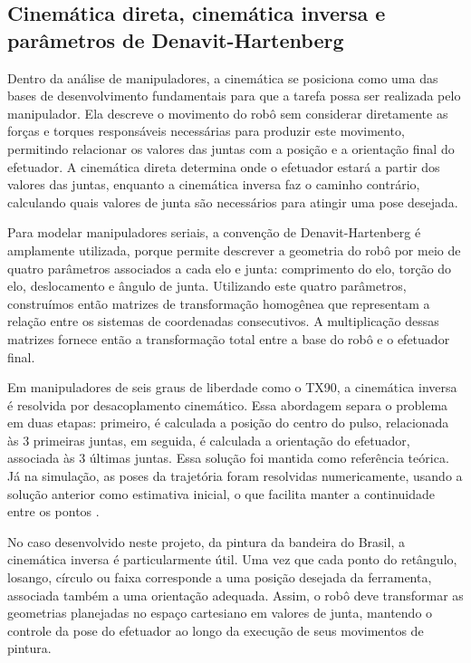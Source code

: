 \subsection{Cinemática direta, cinemática inversa e parâmetros de Denavit-Hartenberg}

Dentro da análise de manipuladores, a cinemática se posiciona como uma das bases de desenvolvimento fundamentais para que a tarefa possa ser realizada pelo manipulador. Ela descreve o movimento do robô sem considerar diretamente as forças e torques responsáveis necessárias para produzir este movimento, permitindo relacionar os valores das juntas com a posição e a orientação final do efetuador. A cinemática direta determina onde o efetuador estará a partir dos valores das juntas, enquanto a cinemática inversa faz o caminho contrário, calculando quais valores de junta são necessários para atingir uma pose desejada. 

Para modelar manipuladores seriais, a convenção de Denavit-Hartenberg é amplamente utilizada, porque permite descrever a geometria do robô por meio de quatro parâmetros associados a cada elo e junta: comprimento do elo, torção do elo, deslocamento e ângulo de junta. Utilizando este quatro parâmetros, construímos então matrizes de transformação homogênea que representam a relação entre os sistemas de coordenadas consecutivos. A multiplicação dessas matrizes fornece então a transformação total entre a base do robô e o efetuador final. 

Em manipuladores de seis graus de liberdade como o TX90, a cinemática inversa é resolvida por desacoplamento cinemático. Essa abordagem separa o problema em duas etapas: primeiro, é calculada a posição do centro do pulso, relacionada às 3 primeiras juntas, em seguida, é calculada a orientação do efetuador, associada às 3 últimas juntas. Essa solução foi mantida como referência teórica. Já na simulação, as poses da trajetória foram resolvidas numericamente, usando a solução anterior como estimativa inicial, o que facilita manter a continuidade entre os pontos \cite{craig2005,siciliano2010}.

No caso desenvolvido neste projeto, da pintura da bandeira do Brasil, a cinemática inversa é particularmente útil. Uma vez que cada ponto do retângulo, losango, círculo ou faixa corresponde a uma posição desejada da ferramenta, associada também a uma orientação adequada. Assim, o robô deve transformar as geometrias planejadas no espaço cartesiano em valores de junta, mantendo o controle da pose do efetuador ao longo da execução de seus movimentos de pintura.


